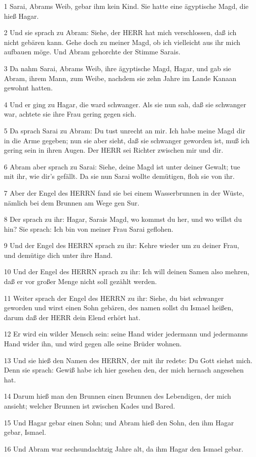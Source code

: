 \par 1 Sarai, Abrams Weib, gebar ihm kein Kind. Sie hatte eine ägyptische Magd, die hieß Hagar.
\par 2 Und sie sprach zu Abram: Siehe, der HERR hat mich verschlossen, daß ich nicht gebären kann. Gehe doch zu meiner Magd, ob ich vielleicht aus ihr mich aufbauen möge. Und Abram gehorchte der Stimme Sarais.
\par 3 Da nahm Sarai, Abrams Weib, ihre ägyptische Magd, Hagar, und gab sie Abram, ihrem Mann, zum Weibe, nachdem sie zehn Jahre im Lande Kanaan gewohnt hatten.
\par 4 Und er ging zu Hagar, die ward schwanger. Als sie nun sah, daß sie schwanger war, achtete sie ihre Frau gering gegen sich.
\par 5 Da sprach Sarai zu Abram: Du tust unrecht an mir. Ich habe meine Magd dir in die Arme gegeben; nun sie aber sieht, daß sie schwanger geworden ist, muß ich gering sein in ihren Augen. Der HERR sei Richter zwischen mir und dir.
\par 6 Abram aber sprach zu Sarai: Siehe, deine Magd ist unter deiner Gewalt; tue mit ihr, wie dir's gefällt. Da sie nun Sarai wollte demütigen, floh sie von ihr.
\par 7 Aber der Engel des HERRN fand sie bei einem Wasserbrunnen in der Wüste, nämlich bei dem Brunnen am Wege gen Sur.
\par 8 Der sprach zu ihr: Hagar, Sarais Magd, wo kommst du her, und wo willst du hin? Sie sprach: Ich bin von meiner Frau Sarai geflohen.
\par 9 Und der Engel des HERRN sprach zu ihr: Kehre wieder um zu deiner Frau, und demütige dich unter ihre Hand.
\par 10 Und der Engel des HERRN sprach zu ihr: Ich will deinen Samen also mehren, daß er vor großer Menge nicht soll gezählt werden.
\par 11 Weiter sprach der Engel des HERRN zu ihr: Siehe, du bist schwanger geworden und wirst einen Sohn gebären, des namen sollst du Ismael heißen, darum daß der HERR dein Elend erhört hat.
\par 12 Er wird ein wilder Mensch sein: seine Hand wider jedermann und jedermanns Hand wider ihn, und wird gegen alle seine Brüder wohnen.
\par 13 Und sie hieß den Namen des HERRN, der mit ihr redete: Du Gott siehst mich. Denn sie sprach: Gewiß habe ich hier gesehen den, der mich hernach angesehen hat.
\par 14 Darum hieß man den Brunnen einen Brunnen des Lebendigen, der mich ansieht; welcher Brunnen ist zwischen Kades und Bared.
\par 15 Und Hagar gebar einen Sohn; und Abram hieß den Sohn, den ihm Hagar gebar, Ismael.
\par 16 Und Abram war sechsundachtzig Jahre alt, da ihm Hagar den Ismael gebar.

